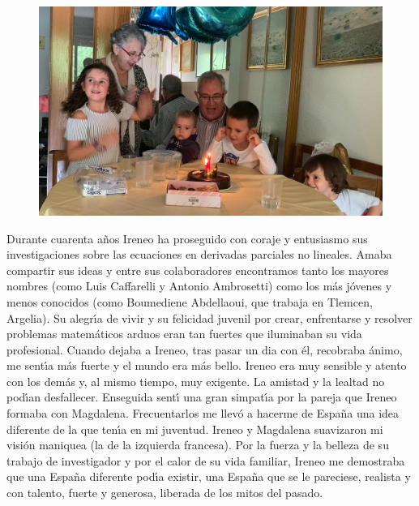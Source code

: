 \begin{figure}%
\begin{center}
\includegraphics[width=0.7\linewidth]{IP_foto_Nietos2.jpg}
\end{center}
\end{figure}
    


Durante cuarenta a\~nos  Ireneo ha proseguido con coraje  y entusiasmo sus investigaciones sobre las ecuaciones en derivadas parciales no lineales. Amaba compartir sus ideas y entre sus colaboradores encontramos tanto los mayores nombres (como Luis Caffarelli y Antonio Ambrosetti) como los m\'as j\'ovenes y menos conocidos (como Boumediene Abdellaoui, que trabaja en Tlemcen, Argelia). Su alegr{\'\i}a de vivir y su felicidad juvenil por crear, enfrentarse y resolver problemas matem\'aticos arduos eran tan fuertes que iluminaban su vida profesional. Cuando dejaba a Ireneo, tras pasar un dia con \'el, recobraba \'animo, me sent{\'\i}a m\'as fuerte y el mundo era m\'as bello.
Ireneo era muy sensible y atento con  los dem\'as y, al mismo tiempo, muy exigente. La amistad y la lealtad no pod{\'\i}an desfallecer. Enseguida sent{\'\i} una gran 
simpat{\'\i}a por la pareja que Ireneo formaba con Magdalena. Frecuentarlos me llev\'o a hacerme de Espa\~na una idea diferente de la que ten{\'\i}a en mi juventud. Ireneo y Magdalena suavizaron mi visi\'on maniquea (la de la izquierda francesa). Por la fuerza y la belleza de su trabajo de investigador y por el calor de su vida familiar, Ireneo me demostraba que una Espa\~na diferente pod{\'\i}a existir, una Espa\~na que se le pareciese, realista y con talento, fuerte y generosa, liberada de los mitos del pasado. 

%
%
%
